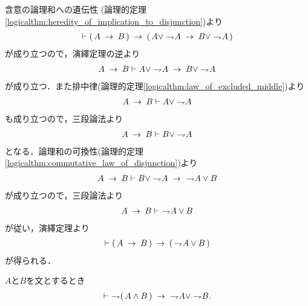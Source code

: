 	\begin{prf}
		含意の論理和への遺伝性
		(論理的定理\ref{logicalthm:heredity_of_implication_to_disjunction})より
		\begin{align}
			\vdash (\, A \rarrow B\, ) 
			\rarrow (\, A \vee \negation A \rarrow B \vee \negation A\, )
		\end{align}
		が成り立つので，演繹定理の逆より
		\begin{align}
			A \rarrow B \vdash A \vee \negation A \rarrow B \vee \negation A
		\end{align}
		が成り立つ．また排中律(論理的定理\ref{logicalthm:law_of_excluded_middle})より
		\begin{align}
			A \rarrow B \vdash A \vee \negation A
		\end{align}
		も成り立つので，三段論法より
		\begin{align}
			A \rarrow B \vdash B \vee \negation A
		\end{align}
		となる．論理和の可換性(論理的定理\ref{logicalthm:commutative_law_of_disjunction})より
		\begin{align}
			A \rarrow B \vdash B \vee \negation A \rarrow\ \negation A \vee B
		\end{align}
		が成り立つので，三段論法より
		\begin{align}
			A \rarrow B \vdash\ \negation A \vee B
		\end{align}
		が従い，演繹定理より
		\begin{align}
			\vdash (\, A \rarrow B\, ) \rarrow (\, \negation A \vee B\, )
		\end{align}
		が得られる．
		\QED
	\end{prf}
	
	\begin{screen}
		\begin{logicalthm}
		\label{logicalthm:strong_De_Morgan_law_2}
			$A$と$B$を文とするとき
			\begin{align}
				\vdash\ \negation (\, A \wedge B\, )
				\rarrow\ \negation A \vee \negation B.
			\end{align}
		\end{logicalthm}
	\end{screen}
	
